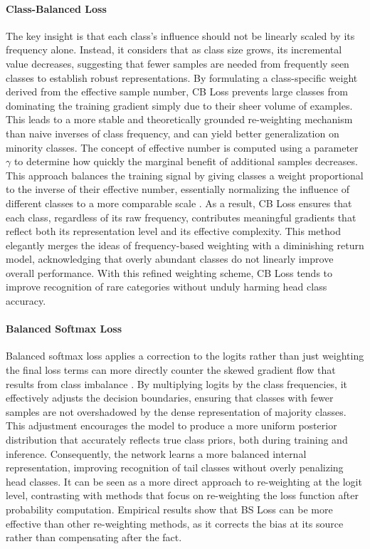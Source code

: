\paragraph{Class-Balanced Loss}
The key insight is that each class’s influence should not be linearly scaled by its frequency alone. Instead, it considers that as class size grows, its incremental value decreases, suggesting that fewer samples are needed from frequently seen classes to establish robust representations. By formulating a class-specific weight derived from the effective sample number, CB Loss prevents large classes from dominating the training gradient simply due to their sheer volume of examples. This leads to a more stable and theoretically grounded re-weighting mechanism than naive inverses of class frequency, and can yield better generalization on minority classes. The concept of effective number is computed using a parameter $\gamma$ to determine how quickly the marginal benefit of additional samples decreases. This approach balances the training signal by giving classes a weight proportional to the inverse of their effective number, essentially normalizing the influence of different classes to a more comparable scale \cite{zhang2023deep}. As a result, CB Loss ensures that each class, regardless of its raw frequency, contributes meaningful gradients that reflect both its representation level and its effective complexity. This method elegantly merges the ideas of frequency-based weighting with a diminishing return model, acknowledging that overly abundant classes do not linearly improve overall performance. With this refined weighting scheme, CB Loss tends to improve recognition of rare categories without unduly harming head class accuracy. 

\paragraph{Balanced Softmax Loss}
Balanced softmax loss applies a correction to the logits rather than just weighting the final loss terms can more directly counter the skewed gradient flow that results from class imbalance \cite{ren2020balancedmetasoftmaxlongtailedvisual}. By multiplying logits by the class frequencies, it effectively adjusts the decision boundaries, ensuring that classes with fewer samples are not overshadowed by the dense representation of majority classes. This adjustment encourages the model to produce a more uniform posterior distribution that accurately reflects true class priors, both during training and inference. Consequently, the network learns a more balanced internal representation, improving recognition of tail classes without overly penalizing head classes. It can be seen as a more direct approach to re-weighting at the logit level, contrasting with methods that focus on re-weighting the loss function after probability computation. Empirical results show that BS Loss can be more effective than other re-weighting methods, as it corrects the bias at its source rather than compensating after the fact.

